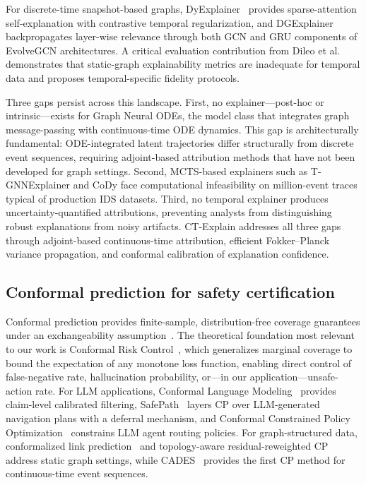 \documentclass[preprint,review,12pt]{elsarticle}
\begin{document}
For discrete-time snapshot-based graphs, DyExplainer~\cite{dyexplainer_2025} provides sparse-attention self-explanation with contrastive temporal regularization, and DGExplainer~\cite{dgexplainer_ijcai_2025} backpropagates layer-wise relevance through both GCN and GRU components of EvolveGCN architectures. A critical evaluation contribution from Dileo et al.~\cite{dileo_evaluation_2025} demonstrates that static-graph explainability metrics are inadequate for temporal data and proposes temporal-specific fidelity protocols.

Three gaps persist across this landscape. First, no explainer---post-hoc or intrinsic---exists for Graph Neural ODEs, the model class that integrates graph message-passing with continuous-time ODE dynamics. This gap is architecturally fundamental: ODE-integrated latent trajectories differ structurally from discrete event sequences, requiring adjoint-based attribution methods that have not been developed for graph settings. Second, MCTS-based explainers such as T-GNNExplainer and CoDy face computational infeasibility on million-event traces typical of production IDS datasets. Third, no temporal explainer produces uncertainty-quantified attributions, preventing analysts from distinguishing robust explanations from noisy artifacts. CT-Explain addresses all three gaps through adjoint-based continuous-time attribution, efficient Fokker--Planck variance propagation, and conformal calibration of explanation confidence.

\subsection{Conformal prediction for safety certification}

Conformal prediction provides finite-sample, distribution-free coverage guarantees under an exchangeability assumption~\cite{vovk_alrw_2022,angelopoulos_cp_gentle_2023}. The theoretical foundation most relevant to our work is Conformal Risk Control~\cite{angelopoulos_crc_2024}, which generalizes marginal coverage to bound the expectation of any monotone loss function, enabling direct control of false-negative rate, hallucination probability, or---in our application---unsafe-action rate. For LLM applications, Conformal Language Modeling~\cite{quach_clm_2024} provides claim-level calibrated filtering, SafePath~\cite{safepath_2025} layers CP over LLM-generated navigation plans with a deferral mechanism, and Conformal Constrained Policy Optimization~\cite{conformal_cpo_2025} constrains LLM agent routing policies. For graph-structured data, conformalized link prediction~\cite{conformalized_link_2024} and topology-aware residual-reweighted CP~\cite{residual_reweighted_cp_2025} address static graph settings, while CADES~\cite{cades_2025} provides the first CP method for continuous-time event sequences.
\end{document}
